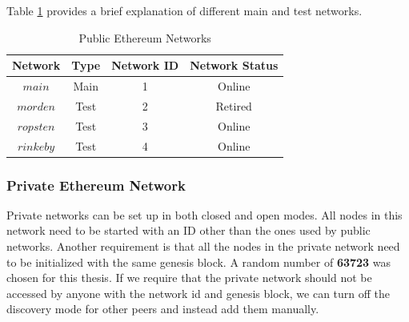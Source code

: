 \documentclass[11pt,openright]{report}
\begin{document}
Table \ref{pub_eth_networks} provides a brief explanation of different main and test networks. 
\newpage
\hfill\\
\begin{table}[!htbp]
	\renewcommand{\arraystretch}{1.3}
	\caption{Public Ethereum Networks}
	\label{pub_eth_networks}
	\centering
	\begin{tabular}{|c||c|c|c|}
		\hline
		\bfseries Network & \bfseries Type & \bfseries Network ID & \bfseries Network Status \\
		\hline\hline
		$main$ & Main & 1 & Online \\ \hline
		$morden$ & Test & 2 & Retired \\ \hline
		$ropsten$ & Test & 3 & Online \\ \hline
		$rinkeby$ & Test & 4 & Online \\ \hline
	\end{tabular}
\end{table}
\newline
\newline
\subsubsection{Private Ethereum Network}
Private networks can be set up in both closed and open modes. All nodes in this network need to be started with an ID other than the ones used by public networks. Another requirement is that all the nodes in the private network need to be initialized with the same genesis block. A random number of \textbf{63723} was chosen for this thesis. If we require that the private network should not be accessed by anyone with the network id and genesis block, we can turn off the discovery mode for other peers and instead add them manually.
\end{document}
